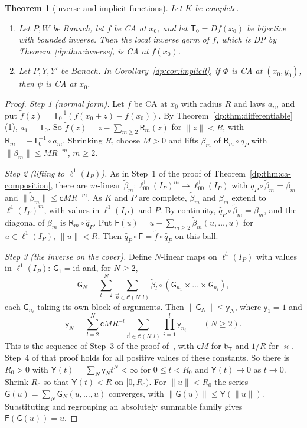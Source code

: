 \documentclass[11pt]{amsart}
\newtheorem{theorem}{Theorem}[section]
\theoremstyle{definition}
\theoremstyle{remark}
\numberwithin{equation}{section}
\newcommand{\id}{\mathrm{id}}
\newcommand{\norm}[1]{\lVert #1\rVert}
\theoremstyle{plain}
\theoremstyle{definition}
\theoremstyle{plain}
\begin{document}
\begin{theorem}[inverse and implicit functions]\label{dp:thm:ca-inverse}
Let $K$ be complete.
\begin{enumerate}
\item Let $P,W$ be Banach, let $f$ be CA at $x_0$, and let $\mathsf T_0=Df(x_0)$ be bijective with bounded inverse. Then the local inverse germ of $f$, which is DP by Theorem~\ref{dp:thm:inverse}, is CA at $f(x_0)$.
\item Let $P,Y,Y'$ be Banach. In Corollary~\ref{dp:cor:implicit}, if $\Phi$ is CA at $(x_0,y_0)$, then $\psi$ is CA at $x_0$.
\end{enumerate}
\end{theorem}

\begin{proof}
\emph{Step 1 (normal form).} Let $f$ be CA at $x_0$ with radius $R$ and laws $a_n$, and put $\tilde f(z)=\mathsf T_0^{-1}(f(x_0+z)-f(x_0))$. By Theorem~\ref{dp:thm:differentiable}(1), $a_1=\mathsf T_0$. So $\tilde f(z)=z-\sum_{m\ge2}\mathsf R_m(z)$ for $\norm z<R$, with $\mathsf R_m=-\mathsf T_0^{-1}\circ a_m$. Shrinking $R$, choose $M>0$ and lifts $\beta_m$ of $\mathsf R_m\circ q_P$ with $\norm{\beta_m}\le MR^{-m}$, $m\ge2$.

\emph{Step 2 (lifting to $\ell^1(I_P)$).} As in Step~1 of the proof of Theorem~\ref{dp:thm:ca-composition}, there are $m$-linear $\tilde\beta_m\colon\ell^1_{00}(I_P)^m\to\ell^1_{00}(I_P)$ with $q_P\circ\tilde\beta_m=\beta_m$ and $\norm{\tilde\beta_m}\le\mathsf cMR^{-m}$. As $K$ and $P$ are complete, $\tilde\beta_m$ and $\beta_m$ extend to $\ell^1(I_P)^m$, with values in $\ell^1(I_P)$ and $P$. By continuity, $\hat q_P\circ\tilde\beta_m=\beta_m$, and the diagonal of $\beta_m$ is $\mathsf R_m\circ\hat q_P$. Put $\mathsf F(u)=u-\sum_{m\ge2}\tilde\beta_m(u,\dots,u)$ for $u\in\ell^1(I_P)$, $\norm u<R$. Then $\hat q_P\circ\mathsf F=\tilde f\circ\hat q_P$ on this ball.

\emph{Step 3 (the inverse on the cover).} Define $N$-linear maps on $\ell^1(I_P)$ with values in $\ell^1(I_P)$: $\mathsf G_1=\id$ and, for $N\ge2$,
\[
 \mathsf G_N=\sum_{l=2}^N\sum_{\vec n\in\mathcal C(N,l)}\tilde\beta_l\circ(\mathsf G_{n_1}\times\dots\times\mathsf G_{n_l}),
\]
each $\mathsf G_{n_i}$ taking its own block of arguments. Then $\norm{\mathsf G_N}\le\mathsf y_N$, where $\mathsf y_1=1$ and
\[
 \mathsf y_N=\sum_{l=2}^N\mathsf cMR^{-l}\sum_{\vec n\in\mathcal C(N,l)}\prod_{i=1}^l\mathsf y_{n_i}\qquad(N\ge2).
\]
This is the sequence of Step~3 of the proof of~\cite[Lemma~Q.14]{I}, with $\mathsf cM$ for $\mathfrak b_{\mathsf T}$ and $1/R$ for $\varkappa$. Step~4 of that proof holds for all positive values of these constants. So there is $R_0>0$ with $\mathsf Y(t)=\sum_N\mathsf y_Nt^N<\infty$ for $0\le t<R_0$ and $\mathsf Y(t)\to0$ as $t\to0$. Shrink $R_0$ so that $\mathsf Y(t)<R$ on $[0,R_0)$. For $\norm u<R_0$ the series $\mathsf G(u)=\sum_N\mathsf G_N(u,\dots,u)$ converges, with $\norm{\mathsf G(u)}\le\mathsf Y(\norm u)$. Substituting and regrouping an absolutely summable family gives $\mathsf F(\mathsf G(u))=u$.


\end{proof}
\end{document}
